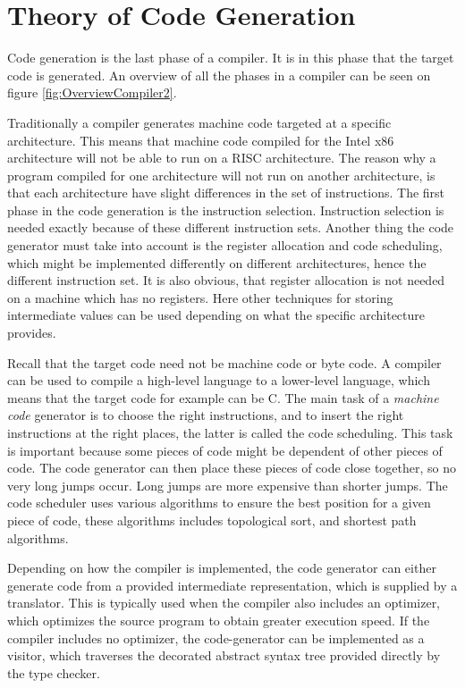\section{Theory of Code Generation}
Code generation is the last phase of a compiler. It is in this phase that the target code is generated. An overview of all the phases in a compiler can be seen on figure \ref{fig:OverviewCompiler2}.

Traditionally a compiler generates machine code targeted at a specific architecture. This means that machine code compiled for the Intel x86 architecture will not be able to run on a RISC architecture. The reason why a program compiled for one architecture will not run on another architecture, is that each architecture have slight differences in the set of instructions. The first phase in the code generation is the instruction selection. Instruction selection is needed exactly because of these different instruction sets. Another thing the code generator must take into account is the register allocation and code scheduling, which might be implemented differently on different architectures, hence the different instruction set. It is also obvious, that register allocation is not needed on a machine which has no registers. Here other techniques for storing intermediate values can be used depending on what the specific architecture provides.

Recall that the target code need not be machine code or byte code. A compiler can be used to compile a high-level language to a lower-level language, which means that the target code for example can be C. The main task of a \emph{machine code} generator is to choose the right instructions, and to insert the right instructions at the right places, the latter is called the code scheduling. This task is important because some pieces of code might be dependent of other pieces of code. The code generator can then place these pieces of code close together, so no very long jumps occur. Long jumps are more expensive than shorter jumps. The code scheduler uses various algorithms to ensure the best position for a given piece of code, these algorithms includes topological sort, and shortest path algorithms.

Depending on how the compiler is implemented, the code generator can either generate code from a provided intermediate representation, which is supplied by a translator. This is typically used when the compiler also includes an optimizer, which optimizes the source program to obtain greater execution speed. If the compiler includes no optimizer, the code-generator can be implemented as a visitor, which traverses the decorated abstract syntax tree provided directly by the type checker.